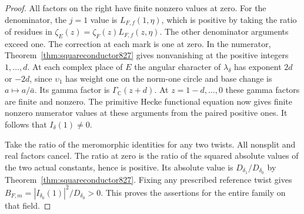 \documentclass[a4paper,11pt]{article}
\theoremstyle{definition}
\theoremstyle{remark}
\numberwithin{equation}{section}
\begin{document}
\begin{proof}
All factors on the right have finite nonzero values at zero.
For the denominator, the \(j=1\) value is \(L_{F,f}(1,\eta)\),
which is positive by taking the ratio of residues in
\(\zeta_E(z)=\zeta_F(z)L_{F,f}(z,\eta)\). The other denominator
arguments exceed one. The correction at each mark is one
at zero. In the numerator, Theorem~\ref{thm:squareconductor827}
gives nonvanishing at the positive integers \(1,\ldots,d\).
At each complex place of \(E\) the angular character of
\(\lambda_\delta\) has exponent \(2d\) or \(-2d\), since
\(\upsilon_1\) has weight one on the norm-one circle and
base change is \(a\mapsto a/\bar a\). Its gamma factor is
\(\Gamma_{\mathbb C}(z+d)\). At \(z=1-d,\ldots,0\) these
gamma factors are finite and nonzero. The primitive Hecke
functional equation now gives finite nonzero numerator
values at these arguments from the paired positive ones.
It follows that \(I_\delta(1)\ne0\).

Take the ratio of the meromorphic identities for any two
twists. All nonsplit and real factors cancel. The ratio at
zero is the ratio of the squared absolute values of the
two actual constants, hence is positive. Its absolute
value is \(D_{\delta_1}/D_{\delta_0}\) by
Theorem~\ref{thm:squareconductor827}. Fixing any prescribed
reference twist gives \(B_{F,m}=|I_{\delta_0}(1)|^2/D_{\delta_0}>0\).
This proves the assertions for the entire family on that field.
\end{proof}
\end{document}
